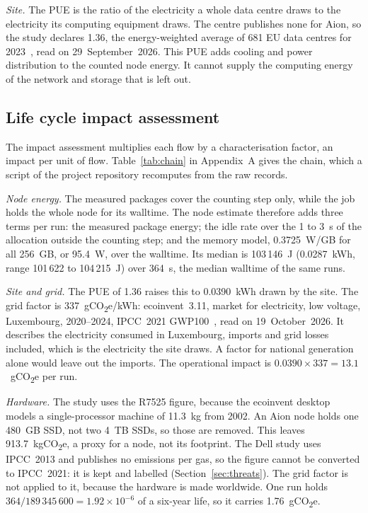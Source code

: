 \documentclass[conference,a4paper]{IEEEtran}
\begin{document}
\emph{Site.} The PUE is the ratio of the electricity a whole data centre draws
to the electricity its computing equipment draws. The centre publishes none for
Aion, so the study declares 1.36, the energy-weighted average of 681 EU data centres for
2023~\cite{eudc2025}, read on 29~September~2026. This PUE adds cooling and power
distribution to the counted node energy. It cannot supply the computing energy
of the network and storage that is left out.

\subsection{Life cycle impact assessment}\label{sec:lcia}
The impact assessment multiplies each flow by a characterisation factor, an
impact per unit of flow. Table~\ref{tab:chain} in Appendix~A gives the chain,
which a script of the project repository recomputes from the raw records.

\emph{Node energy.} The measured packages cover the counting step only, while
the job holds the whole node for its walltime. The node estimate therefore adds
three terms per run: the measured package energy; the idle rate over the 1 to
3~s of the allocation outside the counting step; and the memory model,
0.3725~W/GB for all 256~GB, or 95.4~W, over the walltime. Its median is
103\,146~J (0.0287~kWh, range 101\,622 to 104\,215~J) over 364~s, the median
walltime of the same runs.

\emph{Site and grid.} The PUE of 1.36 raises this to 0.0390~kWh drawn by the
site. The grid factor is 337~gCO\textsubscript{2}e/kWh: ecoinvent~3.11, market
for electricity, low voltage, Luxembourg, 2020--2024, IPCC~2021
GWP100~\cite{ecoinventlu}, read on 19~October~2026. It describes the
electricity consumed in Luxembourg, imports and grid losses included, which is
the electricity the site draws. A factor for national generation alone would
leave out the imports. The operational impact is
$0.0390\times337=13.1$~gCO\textsubscript{2}e per run.

\emph{Hardware.} The study uses the R7525 figure, because the ecoinvent desktop
models a single-processor machine of 11.3~kg from 2002. An Aion node holds one
480~GB SSD, not two 4~TB SSDs, so those are removed. This leaves
913.7~kgCO\textsubscript{2}e, a proxy for a node, not its footprint. The Dell
study uses IPCC~2013 and publishes no emissions per gas, so the figure cannot
be converted to IPCC~2021: it is kept and labelled (Section~\ref{sec:threats}).
The grid factor is not applied to it, because the hardware is made worldwide.
One run holds $364/189\,345\,600=1.92\times10^{-6}$ of a six-year life, so it
carries 1.76~gCO\textsubscript{2}e.
\end{document}
